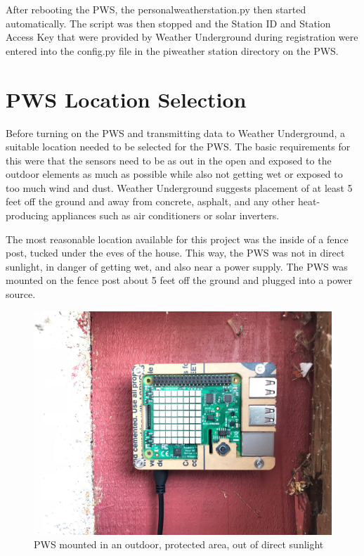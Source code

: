 \documentclass[sigconf]{acmart}
\begin{document}
After rebooting the PWS, the personal\textunderscore weather\textunderscore station.py then started automatically. The script was then stopped and the Station ID and Station Access Key that were provided by Weather Underground during registration were entered into the config.py file in the pi\textunderscore weather \textunderscore station directory on the PWS.

\section{PWS Location Selection}

Before turning on the PWS and transmitting data to Weather Underground, a suitable location needed to be selected for the PWS. The basic requirements for this were that the sensors need to be as out in the open and exposed to the outdoor elements as much as possible while also not getting wet or exposed to too much wind and dust. Weather Underground suggests placement of at least 5 feet off the ground and away from concrete, asphalt, and any other heat-producing appliances such as air conditioners or solar inverters. 

The most reasonable location available for this project was the inside of a fence post, tucked under the eves of the house. This way, the PWS was not in direct sunlight, in danger of getting wet, and also near a power supply. The PWS was mounted on the fence post about 5 feet off the ground and plugged into a power source. 

\begin{figure}[H]
    \centering
    \includegraphics[width=\columnwidth]{images/Location1.jpg}
    \caption{PWS mounted in an outdoor, protected area, out of direct sunlight}
\end{figure}
\end{document}
